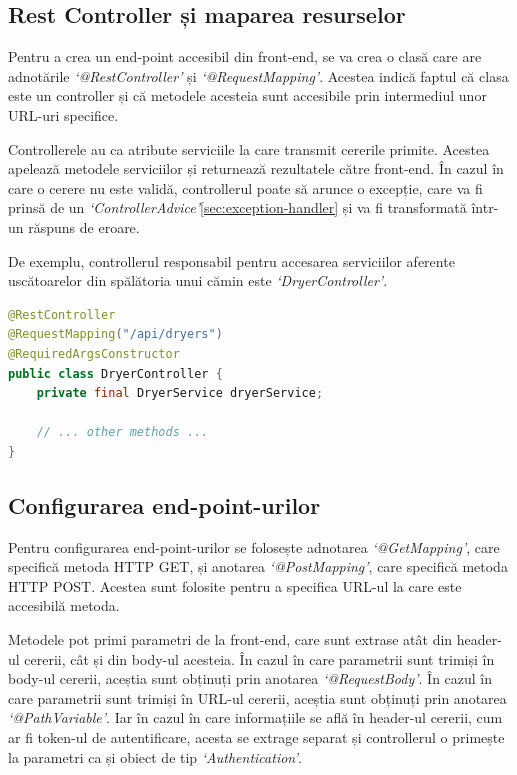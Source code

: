 \documentclass[12pt,a4paper]{report}
\theoremstyle{definition}
\theoremstyle{remark}
\begin{document}
\subsection{Rest Controller și maparea resurselor}

\par Pentru a crea un end-point accesibil din front-end, se va crea o clasă care are adnotările \textit{`@RestController'} și \textit{`@RequestMapping'}\cite{burke2009restful}. Acestea indică faptul că clasa este un controller și că metodele acesteia sunt accesibile prin intermediul unor URL-uri specifice.

\par Controllerele au ca atribute serviciile la care transmit cererile primite. Acestea apelează metodele serviciilor și returnează rezultatele către front-end. În cazul în care o cerere nu este validă, controllerul poate să arunce o excepție, care va fi prinsă de un \textit{`ControllerAdvice'}\ref{sec:exception-handler} și va fi transformată într-un răspuns de eroare.

\par De exemplu, controllerul responsabil pentru accesarea serviciilor aferente \textnormal{us\-că\-toa\-re\-lor} din spălătoria unui cămin este \textit{`DryerController'}.

\begin{lstlisting}[language=Java, caption={Clasa DryerController}]
@RestController
@RequestMapping("/api/dryers")
@RequiredArgsConstructor
public class DryerController {
    private final DryerService dryerService;

    // ... other methods ...
}
\end{lstlisting}

\subsection{Configurarea end-point-urilor}

\par Pentru configurarea end-point-urilor se folosește adnotarea \textit{`@GetMapping'}, care specifică metoda HTTP GET, și anotarea \textit{`@PostMapping'}, care specifică metoda HTTP POST\cite{varanasi2015spring}. Acestea sunt folosite pentru a specifica URL-ul la care este accesibilă metoda.

\par Metodele pot primi parametri de la front-end, care sunt extrase atât din header-ul cererii, cât și din body-ul acesteia. În cazul în care parametrii sunt trimiși în body-ul cererii, aceștia sunt obținuți prin anotarea \textit{`@RequestBody'}. În cazul în care parametrii sunt trimiși în URL-ul cererii, aceștia sunt obținuți prin anotarea \textit{`@PathVariable'}. Iar în cazul în care informațiile se află în header-ul cererii, cum ar fi token-ul de autentificare, acesta se extrage separat și controllerul o primește la parametri ca și obiect de tip \textit{`Authentication'}.
\end{document}
